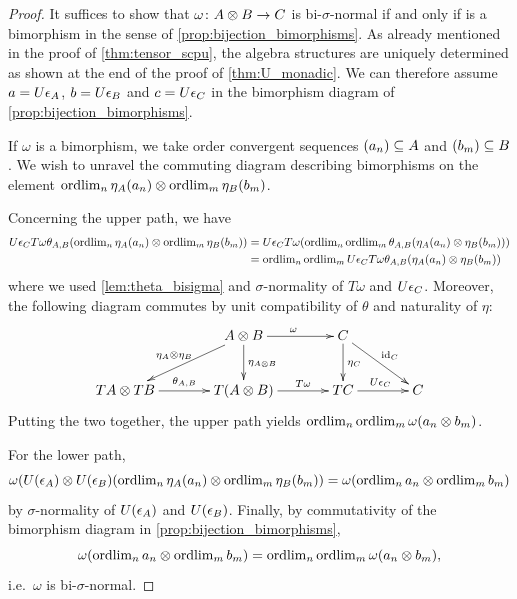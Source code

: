 \begin{proof}
	It suffices to show that $\omega\colon {A} \otimes {B}\to {C}$ is bi-$\sigma$-normal if and only if is a bimorphism in the sense of \cref{prop:bijection_bimorphisms}.
	As already mentioned in the proof of \cref{thm:tensor_scpu}, the algebra structures are uniquely determined as shown at the end of the proof of \cref{thm:U_monadic}.
	We can therefore assume $a=U\epsilon_{{A}}$, $b=U\epsilon_{{B}}$ and $c=U\epsilon_{{C}}$ in the bimorphism diagram of \cref{prop:bijection_bimorphisms}.

	If $\omega$ is a bimorphism, we take order convergent sequences $(a_n)\subseteq {A} $ and $(b_m)\subseteq {B}$.
	We wish to unravel the commuting diagram describing bimorphisms on the element $\operatorname{ordlim}_n \eta_{{A}}(a_n)\otimes \operatorname{ordlim}_m \eta_{{B}}(b_m)$.

	Concerning the upper path, we have
	\begin{align*}
		U\epsilon_{{C}} T\omega \theta_{{A},{B}} (\operatorname{ordlim}_n \eta_{{A}}(a_n)\otimes \operatorname{ordlim}_m \eta_{{B}}(b_m)) & = U\epsilon_{{C}} T\omega (\operatorname{ordlim}_n\operatorname{ordlim}_m \theta_{{A},{B}} (\eta_{{A}}(a_n)\otimes \eta_{{B}}(b_m)))  \\
		&= \operatorname{ordlim}_{n}\operatorname{ordlim}_m  U\epsilon_{{C}} T\omega \theta_{{A},{B}} (\eta_{{A}}(a_n)\otimes \eta_{{B}}(b_m))
	\end{align*}
	where we used \cref{lem:theta_bisigma} and $\sigma$-normality of $T\omega$ and $U\epsilon_{{C}}$.
	Moreover, the following diagram commutes by unit compatibility of $\theta$ and naturality of $\eta$:
	\begin{equation}\label{eq:omega_comm}
		\xymatrixcolsep{3pc}\xymatrix{
		&\A\otimes \B\ar[ld]_{\eta_{\A}\otimes \eta_{\B}} \ar[d]^{\eta_{\A\otimes \B}} \ar[r]^{\omega}& \C\ar[d]^{\eta_{\C}}\ar[rd]^{\id_{\C}}\\
		T\A \otimes T\B \ar[r]^{\theta_{\A,\B}}
		& T(\A\otimes \B) \ar[r]^-{T\omega}
		& T\C \ar[r]^{U\epsilon_{\C}} & \C
		}
	\end{equation}
	Putting the two together, the upper path yields $\operatorname{ordlim}_n \operatorname{ordlim}_m \omega (a_n \otimes b_m)$.

	For the lower path,
	\[
		\omega (U(\epsilon_{{A}})\otimes U(\epsilon_{{B}} )(\operatorname{ordlim}_n \eta_{{A}}(a_n)\otimes \operatorname{ordlim}_m \eta_{{B}}(b_m)) = \omega (\operatorname{ordlim}_n a_n \otimes \operatorname{ordlim}_m b_m)
	\]
	by $\sigma$-normality of $U(\epsilon_{{A}})$ and $U(\epsilon_{{B}})$.
	Finally, by commutativity of the bimorphism diagram in \cref{prop:bijection_bimorphisms},
	\[
		\omega (\operatorname{ordlim}_n a_n \otimes \operatorname{ordlim}_m b_m) = \operatorname{ordlim}_n \operatorname{ordlim}_m \omega (a_n \otimes b_m),
	\]
	i.e.\ $\omega$ is bi-$\sigma$-normal.


\end{proof}
